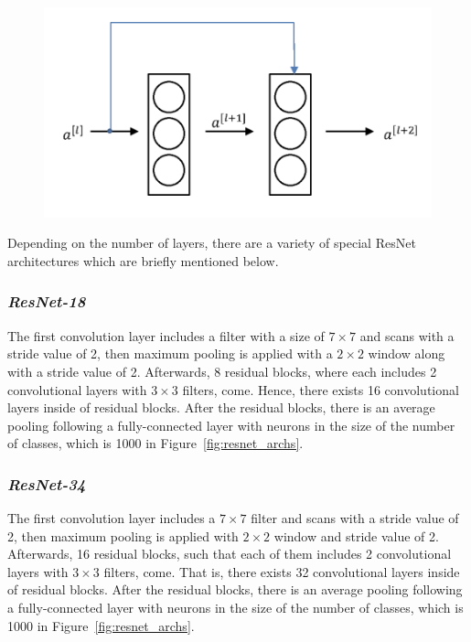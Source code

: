 \begin{figure}[h]
	\centering
	\includegraphics[width=.6\linewidth]{fig/residual_block.png}
	\label{fig:residual_block}
\end{figure}

Depending on the number of layers, there are a variety of special ResNet architectures which are briefly mentioned below.

\subsubsection*{\textit{ResNet-18}}

The first convolution layer includes a filter with a size of $7 \times 7$ and scans with a stride value of 2, then maximum pooling is applied with a $2 \times 2$ window along with a stride value of 2. Afterwards, 8 residual blocks, where each includes 2 convolutional layers with $3 \times 3$ filters, come. Hence, there exists 16 convolutional layers inside of residual blocks. After the residual blocks, there is an average pooling following a fully-connected layer with neurons in the size of the number of classes, which is 1000 in Figure~\ref{fig:resnet_archs}.

\subsubsection*{\textit{ResNet-34}}

The first convolution layer includes a $7 \times  7$ filter and scans with a stride value of 2, then maximum pooling is applied with $2 \times  2$ window and stride value of 2. Afterwards, 16 residual blocks, such that each of them includes 2 convolutional layers with $3 \times 3$ filters, come. That is, there exists 32 convolutional layers inside of residual blocks. After the residual blocks, there is an average pooling following a fully-connected layer with neurons in the size of the number of classes, which is 1000 in Figure~\ref{fig:resnet_archs}.

